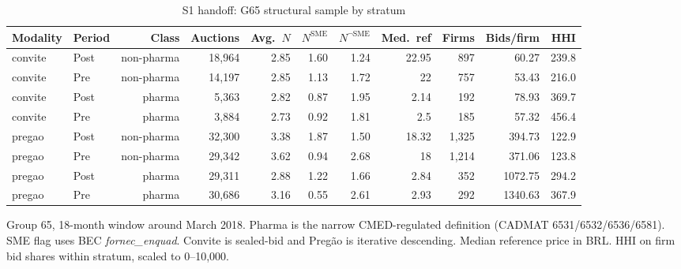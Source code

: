 \begin{table}[htbp]
\centering
\begin{threeparttable}
\caption{S1 handoff: G65 structural sample by stratum}
\label{tab:v3_s1_handoff}
\small
\begin{tabular}{llrrrrrrrrr}
\toprule
Modality & Period & Class & Auctions & Avg.\ $N$ & $N^{\text{SME}}$ & $N^{\neg\text{SME}}$ & Med.\ ref & Firms & Bids/firm & HHI \\
\midrule
convite & Post & non-pharma & 18,964 & 2.85 & 1.60 & 1.24 & 22.95 & 897 & 60.27 & 239.8 \\
convite & Pre & non-pharma & 14,197 & 2.85 & 1.13 & 1.72 & 22 & 757 & 53.43 & 216.0 \\
convite & Post & pharma & 5,363 & 2.82 & 0.87 & 1.95 & 2.14 & 192 & 78.93 & 369.7 \\
convite & Pre & pharma & 3,884 & 2.73 & 0.92 & 1.81 & 2.5 & 185 & 57.32 & 456.4 \\
pregao & Post & non-pharma & 32,300 & 3.38 & 1.87 & 1.50 & 18.32 & 1,325 & 394.73 & 122.9 \\
pregao & Pre & non-pharma & 29,342 & 3.62 & 0.94 & 2.68 & 18 & 1,214 & 371.06 & 123.8 \\
pregao & Post & pharma & 29,311 & 2.88 & 1.22 & 1.66 & 2.84 & 352 & 1072.75 & 294.2 \\
pregao & Pre & pharma & 30,686 & 3.16 & 0.55 & 2.61 & 2.93 & 292 & 1340.63 & 367.9 \\
\bottomrule
\end{tabular}
\begin{tablenotes}\footnotesize
\item Group 65, 18-month window around March 2018. Pharma is the
narrow CMED-regulated definition (CADMAT 6531/6532/6536/6581).
SME flag uses BEC \emph{fornec\_enquad}. Convite is sealed-bid and
Preg\~ao is iterative descending. Median reference price in BRL.
HHI on firm bid shares within stratum, scaled to 0--10{,}000.
\end{tablenotes}
\end{threeparttable}
\end{table}
